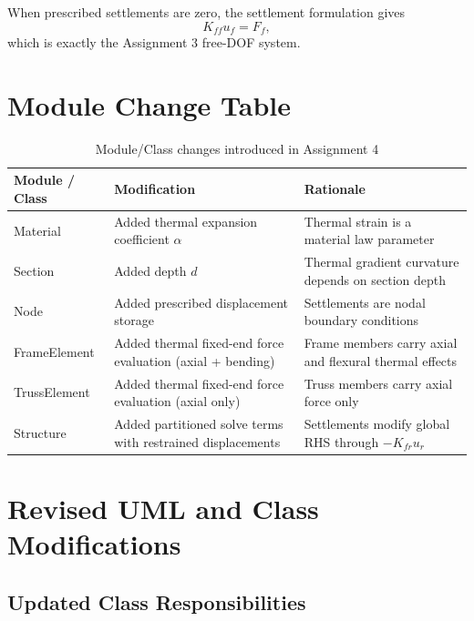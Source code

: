 When prescribed settlements are zero, the settlement formulation gives
\begin{equation}
K_{ff}u_f = F_f,
\end{equation}
which is exactly the Assignment 3 free-DOF system.

\pagebreak
\section{Module Change Table}

\begin{table}[H]
    \centering
    \caption{Module/Class changes introduced in Assignment 4}
    \label{tab:module_change_table}
    \renewcommand{\arraystretch}{1.25}
    \setlength{\tabcolsep}{4pt}
    \begin{tabular}{p{}p{}p{}}
        \toprule
        Module / Class & Modification & Rationale \\
        \midrule
        Material & Added thermal expansion coefficient $\alpha$ & Thermal strain is a material law parameter \\
        Section & Added depth $d$ & Thermal gradient curvature depends on section depth \\
        Node & Added prescribed displacement storage & Settlements are nodal boundary conditions \\
        FrameElement & Added thermal fixed-end force evaluation (axial + bending) & Frame members carry axial and flexural thermal effects \\
        TrussElement & Added thermal fixed-end force evaluation (axial only) & Truss members carry axial force only \\
        Structure & Added partitioned solve terms with restrained displacements & Settlements modify global RHS through $-K_{fr}u_r$ \\
        \bottomrule
    \end{tabular}
    \renewcommand{\arraystretch}{1.0}
    \setlength{\tabcolsep}{6pt}
\end{table}

\pagebreak
\section{Revised UML and Class Modifications}

\subsection{Updated Class Responsibilities}

